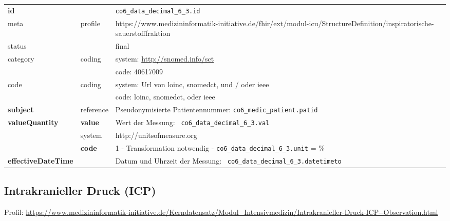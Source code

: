 \begin{longtable}{|l|l|p{7.5cm}|}
	\hline
	\rowcolor{lightgray} \multicolumn{3}{|l|}{Data Mapping (inhaltlich)} \\ \hline
	\textbf{id} &  & \texttt{co6\_data\_decimal\_6\_3.id} \\ \hline
	meta & profile & https://www.medizininformatik-initiative.de/fhir/ext/modul-icu/StructureDefinition/inspiratorische-sauerstofffraktion \\ \hline 
	status &  & final   \\ \hline 
	category & coding & system: \url{http://snomed.info/sct} \\
	\cline{3-3}
	& & code: 40617009 \\ \hline
	code & coding & system: Url von \ac{loinc}, \ac{snomedct}, und / oder \ac{ieee} \\ 
	\cline{3-3} 
	&  & code: \ac{loinc}, \ac{snomedct}, oder \ac{ieee} \\ \hline
	\textbf{subject}  & reference & Pseudonymisierte Patientennummer: \texttt{co6\_medic\_patient.patid} \\ \hline
	\textbf{valueQuantity}  & \textbf{value} & Wert der Messung: \texttt{
		co6\_data\_decimal\_6\_3.val} \\
	\cline{2-3}
	& system & http://unitsofmeasure.org \\
	\cline{2-3}
	& \textbf{code} & 1 - Transformation notwendig - \texttt{co6\_data\_decimal\_6\_3.unit} = \%
	\\ \hline
	\textbf{effectiveDateTime}  & & Datum und Uhrzeit der Messung: \texttt{
		co6\_data\_decimal\_6\_3.datetimeto} \\
	\hline
\end{longtable}

\subsection{Intrakranieller Druck (ICP)} 
 Profil: \url{https://www.medizininformatik-initiative.de/Kerndatensatz/Modul_Intensivmedizin/Intrakranieller-Druck-ICP--Observation.html}

